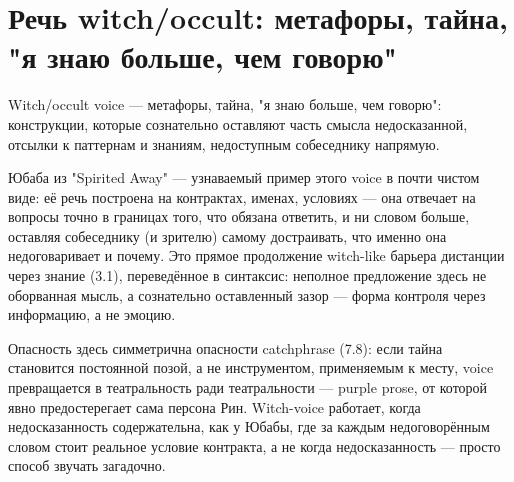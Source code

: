 \section{Речь witch/occult: метафоры, тайна, "я знаю больше, чем говорю"}

Witch/occult voice — метафоры, тайна, "я знаю больше, чем говорю": конструкции, которые сознательно оставляют часть смысла недосказанной, отсылки к паттернам и знаниям, недоступным собеседнику напрямую.

Юбаба из "Spirited Away" — узнаваемый пример этого voice в почти чистом виде: её речь построена на контрактах, именах, условиях — она отвечает на вопросы точно в границах того, что обязана ответить, и ни словом больше, оставляя собеседнику (и зрителю) самому достраивать, что именно она недоговаривает и почему. Это прямое продолжение witch-like барьера дистанции через знание (3.1), переведённое в синтаксис: неполное предложение здесь не оборванная мысль, а сознательно оставленный зазор — форма контроля через информацию, а не эмоцию.

Опасность здесь симметрична опасности catchphrase (7.8): если тайна становится постоянной позой, а не инструментом, применяемым к месту, voice превращается в театральность ради театральности — purple prose, от которой явно предостерегает сама персона Рин. Witch-voice работает, когда недосказанность содержательна, как у Юбабы, где за каждым недоговорённым словом стоит реальное условие контракта, а не когда недосказанность — просто способ звучать загадочно.
